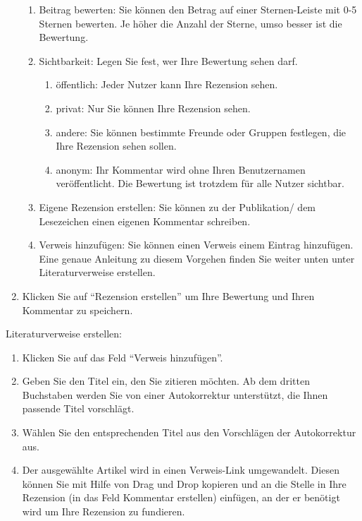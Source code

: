 \documentclass[a4paper,11pt,twoside]{scrbook}
\begin{document}
\begin{enumerate}
\begin{enumerate}
        \item Beitrag bewerten: Sie können den Betrag auf einer Sternen-Leiste mit 0-5 Sternen bewerten. Je höher die Anzahl der Sterne, umso besser ist die Bewertung.
        \item Sichtbarkeit: Legen Sie fest, wer Ihre Bewertung sehen darf.
        \begin{enumerate}
            \item öffentlich: Jeder Nutzer kann Ihre Rezension sehen.
            \item privat: Nur Sie können Ihre Rezension sehen.
            \item andere: Sie können bestimmte Freunde oder Gruppen festlegen, die Ihre Rezension sehen sollen.
            \item anonym: Ihr Kommentar wird ohne Ihren Benutzernamen veröffentlicht. Die Bewertung ist trotzdem für alle Nutzer sichtbar.
        \end{enumerate}
        \item Eigene Rezension erstellen: Sie können zu der Publikation/ dem Lesezeichen einen eigenen Kommentar schreiben.
        \item Verweis hinzufügen: Sie können einen Verweis einem Eintrag hinzufügen. Eine genaue Anleitung zu diesem Vorgehen finden Sie weiter unten unter Literaturverweise erstellen.
    \end{enumerate}
    \item Klicken Sie auf \enquote{Rezension erstellen} um Ihre Bewertung und Ihren Kommentar zu speichern.
\end{enumerate}
Literaturverweise erstellen:
\begin{enumerate}
    \item Klicken Sie auf das Feld \enquote{Verweis hinzufügen}.
    \item Geben Sie den Titel ein, den Sie zitieren möchten. Ab dem dritten Buchstaben werden Sie von einer Autokorrektur unterstützt, die Ihnen passende Titel vorschlägt.
    \item Wählen Sie den entsprechenden Titel aus den Vorschlägen der Autokorrektur aus.
    \item Der ausgewählte Artikel wird in einen Verweis-Link umgewandelt. Diesen können Sie mit Hilfe von Drag und Drop kopieren und an die Stelle in Ihre Rezension (in das Feld Kommentar erstellen) einfügen, an der er benötigt wird um Ihre Rezension zu fundieren.
\end{enumerate}
\end{document}
